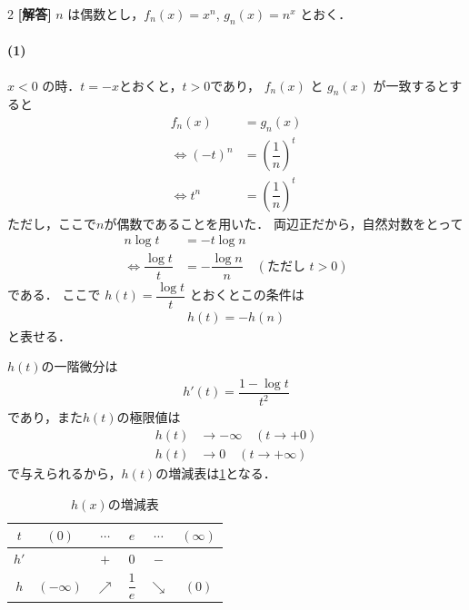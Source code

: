 \documentclass[../../main.tex]{subfiles}
\begin{document}
\setcounter{equation}{0}
\setcounter{figure}{0}
\setcounter{table}{0}
\begin{oframed}
  
\end{oframed}

\setlength{\columnseprule}{0.4pt}
\begin{multicols}{2}
  {\bf [解答]}
  $n$ は偶数とし，$f_n(x) = x^n$, $g_n(x) = n^x$ とおく．

  \paragraph{(1)}

  $x < 0$ の時．$t=-x$とおくと，$t>0$であり，
  $f_n(x)$ と $g_n(x)$ が一致するとすると
  \begin{align}
    f_n(x) & = g_n(x)                     \\
    \iff
    (-t)^n & = \left(\dfrac{1}{n}\right)^t \\
    \iff
    t^n    & = \left(\dfrac{1}{n}\right)^t
  \end{align}
  ただし，ここで$n$が偶数であることを用いた．
  両辺正だから，自然対数をとって
  \begin{align}
    n \log t         & = -t\log n  \nonumber                                             \\
    \iff
    \dfrac{\log t}{t} & = -\dfrac{\log n}{n} \quad (\text{ただし } t > 0) \label{eq:1}
  \end{align}
  である．
  ここで $h(t) = \dfrac{\log t}{t}$ とおくとこの条件は
  \begin{align}
    h(t) = - h(n) \label{eq:2}
  \end{align}
  と表せる．

  $h(t)$の一階微分は
  \begin{align}
    h'(t) = \dfrac{1 - \log t}{t^2}
  \end{align}
  であり，また$h(t)$の極限値は
  \begin{align}
    h(t) & \to -\infty \quad (t \to +0) \\
    h(t) & \to 0 \quad (t \to +\infty)
  \end{align}
  で与えられるから，$h(t)$の増減表は\cref{2004-2:table:1}となる．

  \begin{table}[H]
    \centering
    \caption{$h(x)$の増減表}
    \label{2004-2:table:1}
    \begin{tabular}{|c||c|c|c|c|c|}
      \hline
      $t$  & $(0)$       & $\cdots$   & $e$           & $\cdots$   & $(\infty)$ \\
      \hline
      $h'$ &             & $+$        & $0$           & $-$        &            \\
      \hline
      $h$  & $(-\infty)$ & $\nearrow$ & $\dfrac{1}{e}$ & $\searrow$ & $(0)$      \\
      \hline
    \end{tabular}
  \end{table}


\end{multicols}
\end{document}
